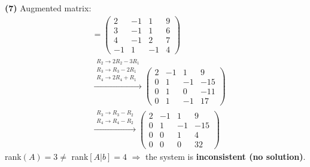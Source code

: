 \noindent\textbf{(7)} Augmented matrix:
\begin{align*}
[A|b] &= \left(\begin{array}{ccc|c}2 & -1 & 1 & 9 \\ 3 & -1 & 1 & 6 \\ 4 & -1 & 2 & 7 \\ -1 & 1 & -1 & 4\end{array}\right) \\
&\xrightarrow{\substack{R_2\to 2R_2-3R_1\\ R_3\to R_3-2R_1\\ R_4\to 2R_4+R_1}} \left(\begin{array}{ccc|c}2 & -1 & 1 & 9 \\ 0 & 1 & -1 & -15 \\ 0 & 1 & 0 & -11 \\ 0 & 1 & -1 & 17\end{array}\right) \\
&\xrightarrow{\substack{R_3\to R_3-R_2\\ R_4\to R_4-R_2}} \left(\begin{array}{ccc|c}2 & -1 & 1 & 9 \\ 0 & 1 & -1 & -15 \\ 0 & 0 & 1 & 4 \\ 0 & 0 & 0 & 32\end{array}\right)
\end{align*}
rank$(A)=3\neq$ rank$[A|b]=4$ $\Rightarrow$ the system is \textbf{inconsistent (no solution)}.

